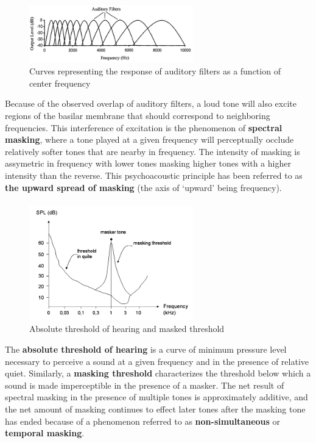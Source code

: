 \begin{figure}
  \centerline{\includegraphics[width=2.8in]{figs/auditoryfilters}}
  \caption{Curves representing the response of auditory filters as a function of center frequency}
  \label{fig:auditoryfilters}
\end{figure}
Because of the observed overlap of auditory filters, a loud tone will also excite regions of the basilar membrane
that should correspond to neighboring frequencies. 
This interference of excitation is the phenomenon of \textbf{spectral masking}, where a tone played at a given 
frequency will perceptually occlude relatively softer tones that are nearby in frequency.
The intensity of masking is assymetric in frequency with lower tones masking higher tones with a higher intensity
than the reverse.
This psychoacoustic principle has been referred to as \textbf{the upward spread of masking} (the axis of `upward' being frequency).
\paragraph{}
\begin{figure}
  \centerline{\includegraphics[width=2.8in]{figs/masked}}
  \caption{Absolute threshold of hearing and masked threshold}
  \label{fig:masked}
\end{figure}
The \textbf{absolute threshold of hearing} is a curve of minimum pressure level necessary to perceive a sound at 
a given frequency and in the presence of relative quiet.
Similarly, a \textbf{masking threshold} characterizes the threshold below which a sound is made imperceptible
in the presence of a masker.
The net result of spectral masking in the presence of multiple tones is approximately additive, and the net amount of 
masking continues to effect later tones after the masking tone has ended because of a phenomenon referred to as \textbf{non-simultaneous} or \textbf{temporal masking}.

